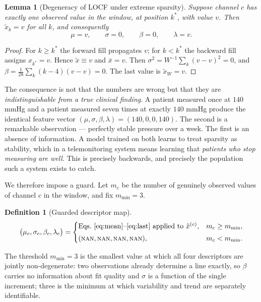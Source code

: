 \documentclass[11pt,a4paper]{article}
\newtheorem{lemma}{Lemma}
\newtheorem{definition}{Definition}
\begin{document}
\begin{lemma}[Degeneracy of LOCF under extreme sparsity]
\label{lem:degeneracy}
Suppose channel $c$ has exactly one observed value in the window, at position
$k^\ast$, with value $v$. Then $\tilde{x}_k = v$ for all $k$, and consequently
\[
  \mu = v,\qquad \sigma = 0,\qquad \beta = 0,\qquad \lambda = v .
\]
\end{lemma}

\begin{proof}
For $k \ge k^\ast$ the forward fill propagates $v$; for $k < k^\ast$ the backward
fill assigns $x_{k^\ast}=v$. Hence $\tilde{x}\equiv v$ and $\bar{x}=v$. Then
$\sigma^2 = W^{-1}\sum_k (v-v)^2 = 0$, and
$\beta = \tfrac{1}{28}\sum_k (k-4)(v-v) = 0$. The last value is $\tilde{x}_W=v$.
\end{proof}

The consequence is not that the numbers are wrong but that they are
\emph{indistinguishable from a true clinical finding}. A patient measured once at
$140$ mmHg and a patient measured seven times at exactly $140$ mmHg produce the
identical feature vector $(\mu,\sigma,\beta,\lambda)=(140,0,0,140)$. The second is
a remarkable observation --- perfectly stable pressure over a week. The first is an
absence of information. A model trained on both learns to treat sparsity as
stability, which in a telemonitoring system means learning that \emph{patients who
stop measuring are well}. This is precisely backwards, and precisely the population
such a system exists to catch.

We therefore impose a guard. Let $m_c$ be the number of genuinely observed values
of channel $c$ in the window, and fix $m_{\min}=3$.

\begin{definition}[Guarded descriptor map]
\label{def:guard}
\[
  \bigl(\mu_c,\sigma_c,\beta_c,\lambda_c\bigr) =
  \begin{cases}
    \text{Eqs.~\eqref{eq:mean}--\eqref{eq:last} applied to } \tilde{x}^{(c)},
      & m_c \ge m_{\min},\\[1mm]
    (\textsc{nan},\textsc{nan},\textsc{nan},\textsc{nan}), & m_c < m_{\min}.
  \end{cases}
\]
\end{definition}

The threshold $m_{\min}=3$ is the smallest value at which all four descriptors are
jointly non-degenerate: two observations already determine a line exactly, so
$\beta$ carries no information about fit quality and $\sigma$ is a function of the
single increment; three is the minimum at which variability and trend are
separately identifiable.
\end{document}
